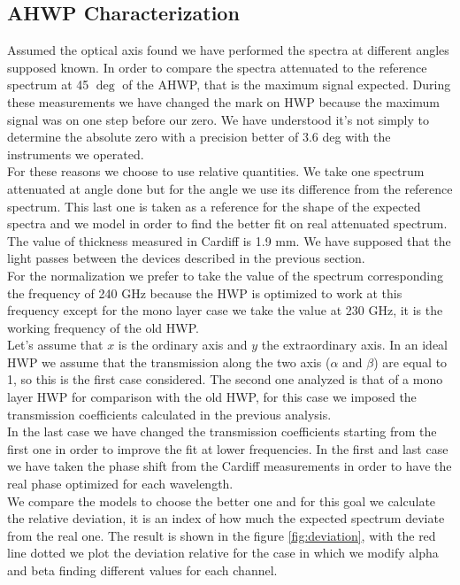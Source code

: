 \documentclass[a4paper,10pt]{article}
\begin{document}
\subsection{AHWP Characterization}
Assumed the optical axis found we have performed the spectra at different angles supposed known. In order to compare the spectra attenuated to the reference spectrum at 45 {$\deg$} of the AHWP, that is the maximum signal expected. During these measurements we have changed the mark on HWP because the maximum signal was on one step before our zero.
We have understood it's not simply to determine the absolute zero with a precision better of 3.6 deg with the instruments we operated.\\
For these reasons we choose to use relative quantities. We take one spectrum attenuated at angle done but for the angle we use its difference from the reference spectrum. This last one is taken as a reference for the shape of the expected spectra and we model in order to find the better fit on real attenuated spectrum.
The value of thickness measured in Cardiff is 1.9 mm. We have supposed that the light passes between the devices described in the previous section.\\
For the normalization we prefer to take the value of the spectrum corresponding the frequency of 240 GHz because the HWP is optimized to work at this frequency except for the mono layer case we take the value at 230 GHz, it is the working frequency of the old HWP.\\
Let's assume that $x$ is the ordinary axis and $y$ the extraordinary axis. In an ideal HWP we assume that the transmission along the two axis ($\alpha$ and $\beta$) are equal to 1, so this is the first case considered. The second one analyzed is that of a mono layer HWP for comparison with the old HWP, for this case we imposed the transmission coefficients calculated in the previous analysis.\\
 In the last case we have changed the transmission coefficients starting from the first one in order to improve the fit at lower frequencies. In the first and last case we have taken the phase shift from the Cardiff measurements in order to have the real phase optimized for each wavelength.\\
We compare the models to choose the better one and for this goal we calculate the relative deviation, it is an index of how much the expected spectrum deviate from the real one. The result is shown in the figure \eqref{fig:deviation}, with the red line dotted we plot the deviation relative for the case in which we modify alpha and beta finding different values for each channel.\\
\end{document}
